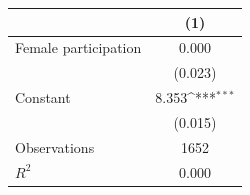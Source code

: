 {
\def\sym#1{\ifmmode^{#1}\else\(^{#1}\)\fi}
\begin{tabular}{l*{1}{c}}
\toprule
                    &\multicolumn{1}{c}{(1)}         \\
\midrule
Female participation&       0.000         \\
                    &     (0.023)         \\
\addlinespace
Constant            &       8.353\sym{***}\\
                    &     (0.015)         \\
\midrule
Observations        &        1652         \\
\(R^{2}\)           &       0.000         \\
\bottomrule
\end{tabular}
}
